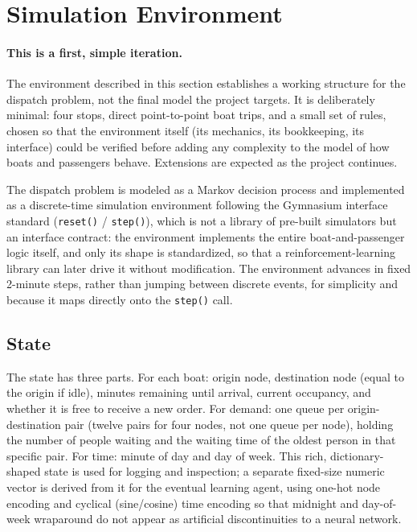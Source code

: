 \documentclass[11pt,a4paper]{article}
\begin{document}
\section{Simulation Environment}
\label{sec:mdp}

\paragraph{This is a first, simple iteration.} The environment described in this section establishes a working structure for the dispatch problem, not the final model the project targets. It is deliberately minimal: four stops, direct point-to-point boat trips, and a small set of rules, chosen so that the environment itself (its mechanics, its bookkeeping, its interface) could be verified before adding any complexity to the model of how boats and passengers behave. Extensions are expected as the project continues.

The dispatch problem is modeled as a Markov decision process and implemented as a discrete-time simulation environment following the Gymnasium interface standard (\texttt{reset()} / \texttt{step()}), which is not a library of pre-built simulators but an interface contract: the environment implements the entire boat-and-passenger logic itself, and only its shape is standardized, so that a reinforcement-learning library can later drive it without modification. The environment advances in fixed 2-minute steps, rather than jumping between discrete events, for simplicity and because it maps directly onto the \texttt{step()} call.

\subsection{State}

The state has three parts. For each boat: origin node, destination node (equal to the origin if idle), minutes remaining until arrival, current occupancy, and whether it is free to receive a new order. For demand: one queue per origin-destination pair (twelve pairs for four nodes, not one queue per node), holding the number of people waiting and the waiting time of the oldest person in that specific pair. For time: minute of day and day of week. This rich, dictionary-shaped state is used for logging and inspection; a separate fixed-size numeric vector is derived from it for the eventual learning agent, using one-hot node encoding and cyclical (sine/cosine) time encoding so that midnight and day-of-week wraparound do not appear as artificial discontinuities to a neural network.
\end{document}

